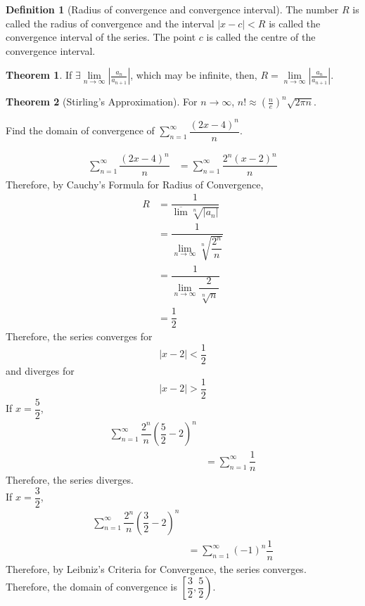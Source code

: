 \documentclass[fleqn, a4paper, 8pt, twoside]{amsart}
\theoremstyle{definition}
\theoremstyle{bluedefinition}
\newtheorem{definition}{Definition}
\theoremstyle{redtheorem}
\newtheorem{theorem}{Theorem}
\begin{document}
\begin{multicols}{2}
\begin{spacing}{0.7}
\begin{definition}[Radius of convergence and convergence interval]
	The number $R$ is called the radius of convergence and the interval $|x - c| < R$ is called the convergence interval of the series.
	The point $c$ is called the centre of the convergence interval.
\end{definition}

\begin{theorem}
	If $\exists \lim\limits_{n \to \infty} \left| \frac{a_n}{a_{n + 1}} \right|$, which may be infinite, then, $R = \lim\limits_{n \to \infty} \left| \frac{a_n}{a_{n + 1}} \right|$.
\end{theorem}

\begin{theorem}[Stirling's Approximation]
	For $n \to \infty$, $n! \approx \left( \frac{n}{e} \right)^n \sqrt{2 \pi n}$.
\end{theorem}

\begin{question}
	Find the domain of convergence of $\sum\limits_{n = 1}^{\infty} \dfrac{(2x - 4)^n}{n}$.
\end{question}

\begin{solution}
	\begin{align*}
		\sum_{n = 1}^{\infty} \dfrac{(2x - 4)^n}{n} &= \sum_{n = 1}^{\infty} \dfrac{2^n (x - 2)^n}{n}
	\end{align*}
	Therefore, by Cauchy's Formula for Radius of Convergence,
	\begin{align*}
		R &= \dfrac{1}{\overline{\lim} \sqrt[n]{|a_n|}}\\
		&= \dfrac{1}{\lim\limits_{n \to \infty} \sqrt[n]{\dfrac{2^n}{n}}}\\
		&= \dfrac{1}{\lim\limits_{n \to \infty} \dfrac{2}{\sqrt[n]{n}}}\\
		&= \dfrac{1}{2}
	\end{align*}
	Therefore, the series converges for
	\begin{equation*}
		|x - 2| < \dfrac{1}{2}
	\end{equation*}
	and diverges for
	\begin{equation*}
		|x - 2| > \dfrac{1}{2}
	\end{equation*}
	If $x = \dfrac{5}{2}$, 
	\begin{align*}
		\sum_{n = 1}^{\infty} \dfrac{2^n}{n} \left( \dfrac{5}{2} - 2 \right)^n\\
		&= \sum_{n = 1}^{\infty} \dfrac{1}{n}
	\end{align*}
	Therefore, the series diverges.\\
	If $x = \dfrac{3}{2}$, 
	\begin{align*}
		\sum_{n = 1}^{\infty} \dfrac{2^n}{n} \left( \dfrac{3}{2} - 2 \right)^n\\
		&= \sum_{n = 1}^{\infty} (-1)^n \dfrac{1}{n}
	\end{align*}
	Therefore, by Leibniz's Criteria for Convergence, the series converges.\\
	Therefore, the domain of convergence is $\left[ \dfrac{3}{2} , \dfrac{5}{2} \right)$.
\end{solution}


\end{spacing}
\end{multicols}
\end{document}
